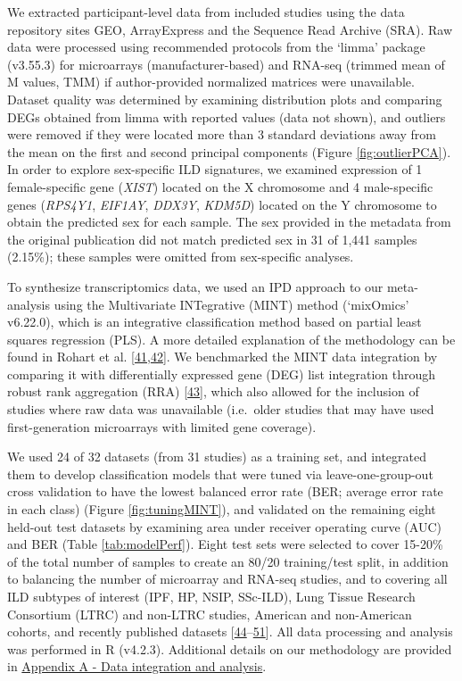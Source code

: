 \documentclass[
]{article}
\begin{document}
We extracted participant-level data from included studies using the data repository sites GEO, ArrayExpress and the Sequence Read Archive (SRA). Raw data were processed using recommended protocols from the `limma' package (v3.55.3) for microarrays (manufacturer-based) and RNA-seq (trimmed mean of M values, TMM) if author-provided normalized matrices were unavailable. Dataset quality was determined by examining distribution plots and comparing DEGs obtained from limma with reported values (data not shown), and outliers were removed if they were located more than 3 standard deviations away from the mean on the first and second principal components (Figure \ref{fig:outlierPCA}). In order to explore sex-specific ILD signatures, we examined expression of 1 female-specific gene (\textit{XIST}) located on the X chromosome and 4 male-specific genes (\textit{RPS4Y1}, \textit{EIF1AY}, \textit{DDX3Y}, \textit{KDM5D}) located on the Y chromosome to obtain the predicted sex for each sample. The sex provided in the metadata from the original publication did not match predicted sex in 31 of 1,441 samples (2.15\%); these samples were omitted from sex-specific analyses.

To synthesize transcriptomics data, we used an IPD approach to our meta-analysis using the Multivariate INTegrative (MINT) method (`mixOmics' v6.22.0), which is an integrative classification method based on partial least squares regression (PLS). A more detailed explanation of the methodology can be found in Rohart et al. {[}\protect\hyperlink{ref-rohart_mint_2017}{41},\protect\hyperlink{ref-rohart_mixomics_2017}{42}{]}. We benchmarked the MINT data integration by comparing it with differentially expressed gene (DEG) list integration through robust rank aggregation (RRA) {[}\protect\hyperlink{ref-kolde_robust_2012}{43}{]}, which also allowed for the inclusion of studies where raw data was unavailable (i.e.~older studies that may have used first-generation microarrays with limited gene coverage).

We used 24 of 32 datasets (from 31 studies) as a training set, and integrated them to develop classification models that were tuned via leave-one-group-out cross validation to have the lowest balanced error rate (BER; average error rate in each class) (Figure \ref{fig:tuningMINT}), and validated on the remaining eight held-out test datasets by examining area under receiver operating curve (AUC) and BER (Table \ref{tab:modelPerf}). Eight test sets were selected to cover 15-20\% of the total number of samples to create an 80/20 training/test split, in addition to balancing the number of microarray and RNA-seq studies, and to covering all ILD subtypes of interest (IPF, HP, NSIP, SSc-ILD), Lung Tissue Research Consortium (LTRC) and non-LTRC studies, American and non-American cohorts, and recently published datasets {[}\protect\hyperlink{ref-bauer_novel_2015}{44}--\protect\hyperlink{ref-jaffar_matrix_2022}{51}{]}. All data processing and analysis was performed in R (v4.2.3). Additional details on our methodology are provided in \protect\hyperlink{data}{Appendix A - Data integration and analysis}.
\end{document}
